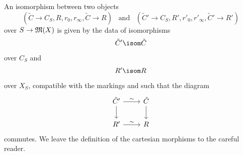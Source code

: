 \documentclass[a4paper,12pt]{article} %
\theoremstyle{definition}
\theoremstyle{plain}%
\begin{document}
An isomorphism between two objects
\begin{equation*}
(\tilde C \to C_S, R, r_0, r_\infty, \tilde C \to R) \,\,\, \text{ and } \,\,\, (\tilde C' \to C_S, R', r'_0, r'_\infty, \tilde C' \to R')
\end{equation*}
over $S \to \frak M(X)$ is given by the data of isomorphisms
\begin{equation*}
\tilde C' \isom \tilde C%
\end{equation*}
over $C_S$ and
\begin{equation*}
R' \isom R
\end{equation*}
over $X_S$, compatible with the markings and such that the diagram
\begin{equation*}
\begin{tikzcd}
\tilde C' \arrow[r, "\sim"] \arrow[d] & \tilde C \arrow[d]\\
R' \arrow[r,"\sim"] & R
\end{tikzcd}
\end{equation*}
commutes. We leave the definition of the cartesian morphisms to the careful reader. 
\end{document}
